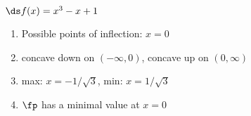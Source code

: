 {$\ds f(x) = x^3-x+1$
}
{\begin{enumerate}[label=(\alph*)]
\item Possible points of inflection: $x=0$
\item concave down on $(-\infty,0)$, concave up on $(0,\infty)$
\item max: $x=-1/\sqrt{3}$, min: $x=1/\sqrt{3}$
\item $\fp$ has a minimal value at $x=0$
\end{enumerate}}
